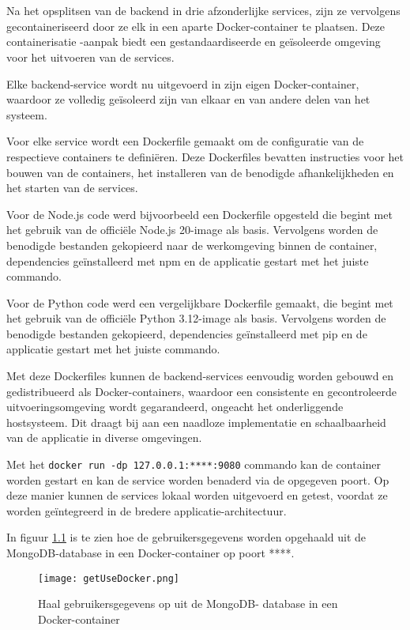 \chapter{}
\label{ch:docker-backend}

Na het opsplitsen van de backend in drie afzonderlijke services, zijn ze vervolgens gecontaineriseerd door ze elk in een aparte Docker-container te plaatsen. Deze containerisatie -aanpak biedt een gestandaardiseerde en geïsoleerde omgeving voor het uitvoeren van de services.

Elke backend-service wordt nu uitgevoerd in zijn eigen Docker-container, waardoor ze volledig geïsoleerd zijn van elkaar en van andere delen van het systeem.

Voor elke service wordt een Dockerfile gemaakt om de configuratie van de respectieve containers te definiëren. Deze Dockerfiles bevatten instructies voor het bouwen van de containers, het installeren van de benodigde afhankelijkheden en het starten van de services.

Voor de Node.js code werd bijvoorbeeld een Dockerfile opgesteld die begint met het gebruik van de officiële Node.js 20-image als basis. Vervolgens worden de benodigde bestanden gekopieerd naar de werkomgeving binnen de container, dependencies geïnstalleerd met npm en de applicatie gestart met het juiste commando.

Voor de Python code werd een vergelijkbare Dockerfile gemaakt, die begint met het gebruik van de officiële Python 3.12-image als basis. Vervolgens worden de benodigde bestanden gekopieerd, dependencies geïnstalleerd met pip en de applicatie gestart met het juiste commando.

Met deze Dockerfiles kunnen de backend-services eenvoudig worden gebouwd en gedistribueerd als Docker-containers, waardoor een consistente en gecontroleerde uitvoeringsomgeving wordt gegarandeerd, ongeacht het onderliggende hostsysteem. Dit draagt bij aan een naadloze implementatie en schaalbaarheid van de applicatie in diverse omgevingen.

Met het \texttt{docker run -dp 127.0.0.1:****:9080} commando kan de container worden gestart en kan de service worden benaderd via de opgegeven poort. Op deze manier kunnen de services lokaal worden uitgevoerd en getest, voordat ze worden geïntegreerd in de bredere applicatie-architectuur.

In figuur \ref{fig:getUserDocker} is te zien hoe de gebruikersgegevens worden opgehaald uit de MongoDB-database in een Docker-container op poort ****.

\begin{figure}[H]
	\centering	
	\texttt{[image: getUseDocker.png]} 
	\caption{Haal gebruikersgegevens op uit de MongoDB- database in een Docker-container}
	\label{fig:getUserDocker} 
\end{figure}
\FloatBarrier